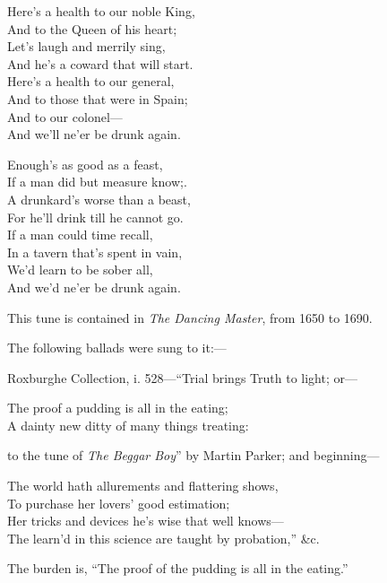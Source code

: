 \begin{dcverse}
\begin{altverse}
Here’s a health to our noble King,\\
And to the Queen of his heart;\\
Let’s laugh and merrily sing,\\
And he’s a coward that will start.\\
Here’s a health to our general,\\
And to those that were in Spain;\\
And to our colonel—\\
And we’ll ne’er be drunk again.
\end{altverse}

\begin{altverse}
Enough’s as good as a feast,\\
If a man did but measure know;.\\
A drunkard’s worse than a beast,\\
For he’ll drink till he cannot go.\\
If a man could time recall,\\
In a tavern that’s spent in vain,\\
We’d learn to be sober all,\\
And we’d ne’er be drunk again.
\end{altverse}
\end{dcverse}


This tune is contained in \textit{The Dancing Master}, from 1650 to 1690.

The following ballads were sung to it:—

Roxburghe Collection, i. 528—“Trial brings Truth to light; or—
\settowidth{\versewidth}{A dainty new ditty of many things treating:}
\begin{scverse}The proof a pudding is all in the eating;\\
A dainty new ditty of many things treating:
\end{scverse}
to the tune of \textit{The Beggar Boy}” by Martin Parker; and beginning—
\settowidth{\versewidth}{Her tricks and devices he’s wise that well knows—}
\begin{scverse}\begin{altverse}
The world hath allurements and flattering shows,\\
To purchase her lovers’ good estimation;\\
Her tricks and devices he’s wise that well knows—\\
The learn’d in this science are taught by probation,” \&c.
\end{altverse}
\end{scverse}
The burden is, “The proof of the pudding is all in the eating.”

